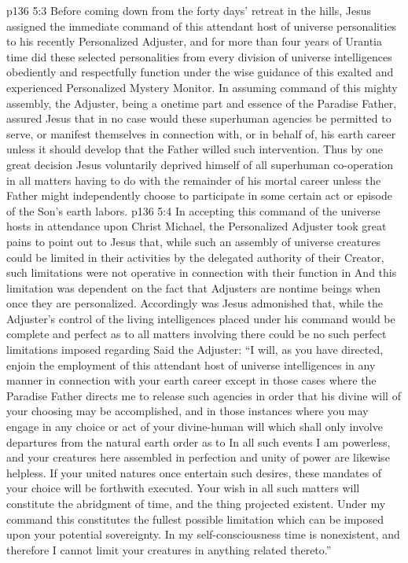 \pc \vs p136 5:3 Before coming down from the forty days’ retreat in the hills, Jesus assigned the immediate command of this attendant host of universe personalities to his recently Personalized Adjuster, and for more than four years of Urantia time did these selected personalities from every division of universe intelligences obediently and respectfully function under the wise guidance of this exalted and experienced Personalized Mystery Monitor. In assuming command of this mighty assembly, the Adjuster, being a onetime part and essence of the Paradise Father, assured Jesus that in no case would these superhuman agencies be permitted to serve, or manifest themselves in connection with, or in behalf of, his earth career unless it should develop that the Father willed such intervention. Thus by one great decision Jesus voluntarily deprived himself of all superhuman co\hyp{}operation in all matters having to do with the remainder of his mortal career unless the Father might independently choose to participate in some certain act or episode of the Son’s earth labors.
\vs p136 5:4 In accepting this command of the universe hosts in attendance upon Christ Michael, the Personalized Adjuster took great pains to point out to Jesus that, while such an assembly of universe creatures could be limited in their  activities by the delegated authority of their Creator, such limitations were not operative in connection with their function in  And this limitation was dependent on the fact that Adjusters are nontime beings when once they are personalized. Accordingly was Jesus admonished that, while the Adjuster’s control of the living intelligences placed under his command would be complete and perfect as to all matters involving  there could be no such perfect limitations imposed regarding  Said the Adjuster: “I will, as you have directed, enjoin the employment of this attendant host of universe intelligences in any manner in connection with your earth career except in those cases where the Paradise Father directs me to release such agencies in order that his divine will of your choosing may be accomplished, and in those instances where you may engage in any choice or act of your divine\hyp{}human will which shall only involve departures from the natural earth order as to  In all such events I am powerless, and your creatures here assembled in perfection and unity of power are likewise helpless. If your united natures once entertain such desires, these mandates of your choice will be forthwith executed. Your wish in all such matters will constitute the abridgment of time, and the thing projected  existent. Under my command this constitutes the fullest possible limitation which can be imposed upon your potential sovereignty. In my self\hyp{}consciousness time is nonexistent, and therefore I cannot limit your creatures in anything related thereto.”
